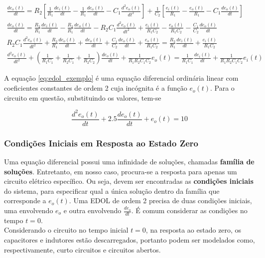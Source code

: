 \documentclass{article}
\numberwithin{equation}{section}
\begin{document}
\begin{gather}
    \frac{de_{o}(t)}{dt} = R_{2} \left[ \frac{1}{R_{1}} \frac{ de_{i}(t) }{ dt } - \frac{1}{R_{1}} \frac{ de_{o}(t) }{ dt } - C_{1}\frac{ d^2e_{o}(t) }{ dt^2 } \right] + \frac{ 1 }{ C_{2} } \left[ \frac{ e_{i}(t) }{ R_{1} } - \frac{ e_{o}(t) }{ R_{1} } - C_{1}\frac{ de_{o}(t) }{ dt } \right] \nonumber \\
    \frac{de_{o}(t)}{dt} = \frac{R_{2}}{R_{1}} \frac{ de_{i}(t) }{ dt } - \frac{R_{2}}{R_{1}} \frac{ de_{o}(t) }{ dt } - R_{2}C_{1}\frac{ d^2e_{o}(t) }{ dt^2 } + \frac{ e_{i}(t) }{ R_{1}C_{2} } - \frac{ e_{o}(t) }{ R_{1}C_{2} } - \frac{C_{1}}{C_{2}} \frac{ de_{o}(t) }{ dt } \nonumber \\
    R_{2}C_{1}\frac{ d^2e_{o}(t) }{ dt^2 } + \frac{R_{2}}{R_{1}} \frac{ de_{o}(t) }{ dt }  + \frac{de_{o}(t)}{dt} + \frac{C_{1}}{C_{2}} \frac{ de_{o}(t) }{ dt } + \frac{ e_{o}(t) }{ R_{1}C_{2} } = \frac{R_{2}}{R_{1}} \frac{ de_{i}(t) }{ dt } + \frac{ e_{i}(t) }{ R_{1}C_{2} } \nonumber \\
    \frac{ d^2e_{o}(t) }{ dt^2 } + \left(\frac{1}{R_{1}C_{1}} + \frac{1}{R_{2}C_{1}} + \frac{1}{R_{2}C_{2}} \right) \frac{ de_{o}(t) }{ dt } + \frac{ 1 }{ R_{1}R_{2}C_{1}C_{2} }e_{o}(t) = \frac{1}{R_{1}C_{1}} \frac{ de_{i}(t) }{ dt } + \frac{ 1 }{ R_{1}R_{2}C_{1}C_{2} }e_{i}(t) \label{eq:edol_exemplo}
\end{gather}

A equação \eqref{eq:edol_exemplo} é uma equação diferencial ordinária linear com coeficientes constantes de ordem 2 cuja incógnita é a função $e_{o}(t)$. Para o circuito em questão, substituindo os valores, tem-se

\begin{equation}
    \frac{ d^2e_{o}(t) }{ dt }+ 2.5 \frac{ de_{o}(t) }{ dt } + e_{o}(t) = 10
\end{equation}

\subsubsection{Condições Iniciais em Resposta ao Estado Zero}
\label{subsubsec:condinics}

Uma equação diferencial possui uma infinidade de soluções, chamadas \textbf{família de soluções}. Entretanto, em nosso caso, procura-se a resposta para apenas um circuito elétrico específico. Ou seja, devem ser encontradas as \textbf{condições iniciais} do sistema, para especificar qual a única solução dentro da família que corresponde a $e_{o}(t)$. Uma EDOL de ordem 2 precisa de duas condições iniciais, uma envolvendo $e_{o}$ e outra envolvendo $\displaystyle{\frac{de_{o}}{dt}}$. É comum considerar as condições no tempo $t=0$. \\
Considerando o circuito no tempo inicial $t=0$, na resposta ao estado zero, os capacitores e indutores estão descarregados, portanto podem ser modelados como, respectivamente, curto circuitos e circuitos abertos.
\end{document}
